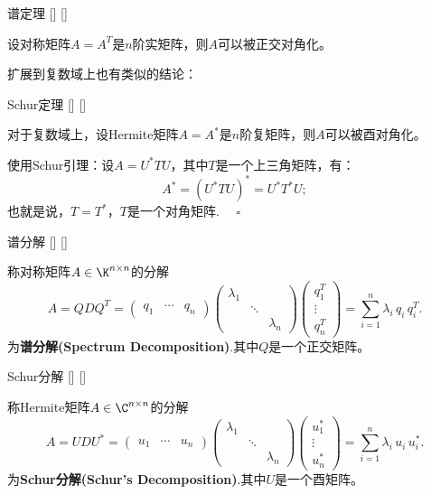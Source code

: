 \documentclass[UTF8]{ctexart}
\begin{document}
		\begin{thm}
			[]
			{谱定理}
			[]
			[]

			设对称矩阵$A=A^T$是$n$阶实矩阵，则$A$可以被正交对角化。
		\end{thm}

		扩展到复数域上也有类似的结论：

		\begin{thm}
			[]
			{Schur定理}
			[]
			[]

			对于复数域上，设Hermite矩阵$A=A^*$是$n$阶复矩阵，则$A$可以被酉对角化。
		\end{thm}

		\begin{prf}
			使用Schur引理：设$A=U^*TU$，其中$T$是一个上三角矩阵，有：\begin{displaymath}
				A^*=(U^*TU)^*=U^*T^*U;
			\end{displaymath}
			也就是说，$T=T^*$，$T$是一个对角矩阵. $\quad\square$
		\end{prf}

		\begin{dfn}
			[]
			{谱分解}
			[]
			[]

			称对称矩阵$A\in\K^{n\times n}$的分解\[
				A=QDQ^T=\begin{pmatrix}
					q_1&\cdots&q_n
				\end{pmatrix}\begin{pmatrix}
					\lambda_1&&\\ &\ddots&\\ &&\lambda_n
				\end{pmatrix}\begin{pmatrix}
					q_1^T\\ \vdots\\ q_n^T
				\end{pmatrix}=\sum_{i=1}^{n}\lambda_i\,q_i\,q_i^T.
			\]
			为\textbf{谱分解(Spectrum Decomposition)}.其中$Q$是一个正交矩阵。
		\end{dfn}

		\begin{dfn}
			[]
			{Schur分解}
			[]
			[]

			称Hermite矩阵$A\in\C^{n\times n}$的分解\[
				A=UDU^*=\begin{pmatrix}
					u_1&\cdots&u_n
				\end{pmatrix}\begin{pmatrix}
					\lambda_1&&\\ &\ddots&\\ &&\lambda_n
				\end{pmatrix}\begin{pmatrix}
					u_1^*\\ \vdots\\ u_n^*
				\end{pmatrix}=\sum_{i=1}^{n}\lambda_i\,u_i\,u_i^*.
			\]
			为\textbf{Schur分解(Schur's Decomposition)}.其中$U$是一个酉矩阵。
		\end{dfn}
\end{document}
